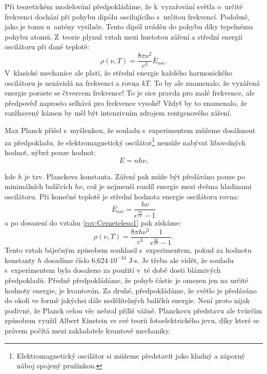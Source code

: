 Při teoretickém modelování předpokládáme, že k~vyzařování světla o~určité frekvenci dochází při pohybu dipólu oscilujícího s~určitou frekvencí. Podobně, jako je tomu u~antény vysílače. Tento dipól uváděn do pohybu díky tepelnému pohybu atomů. Z~teorie plynul vztah mezi hustotou záření a střední energií oscilátoru při dané teplotě:
\begin{equation}
\rho(\nu,T)=\frac{8\pi\nu^2}{c^3}\bar{E}_{osc}\mbox{.}
\label{rov:Cerneteleso1}
\end{equation}
V~klasické mechanice ale platí, že střední energie každého harmonického oscilátoru je nezávislá na frekvenci a rovna $kT$. To by ale znamenalo, že vyzářená energie poroste se čtvercem frekvence! To je sice pravda pro malé frekvence, ale předpověď naprosto selhává pro frekvence vysoké! Vždyť by to znamenalo, že rozžhavený kámen by měl být intenzivním zdrojem rentgenového záření. 

Max Planck přišel s~myšlenkou, že souladu s~experimentem můžeme dosáhnout za předpokladu, že elektromagnetický oscilátor\footnote{ Elektromagnetický oscilátor si můžeme představit jako kladný a záporný náboj spojený pružinkou.} nemůže nabývat libovolných hodnot, nýbrž pouze hodnot:
\begin{equation}
E=nh\nu\mbox{,}
\label{rov:Cerneteleso2}
\end{equation}

\noindent kde $h$ je tzv. Planckova konstanta. Záření pak může být předáváno pouze po minimálních balíčcích $h\nu$, což je nejmenší rozdíl energie mezi dvěma hladinami oscilátoru. Při konečné teplotě je střední hodnota energie oscilátoru rovna:
\begin{equation}
\bar{E}_{osc}=\frac{h\nu}{e^{\frac{h\nu}{kT}}-1}\mbox{}
\label{rov:Cerneteleso3}
\end{equation}
a po dosazení do vztahu \ref{rov:Cerneteleso1} pak získáme:
\begin{equation}
\rho(\nu,T) = \frac{8\pi h\nu^3}{c^3}\frac{1}{e^{\frac{h\nu}{kT}}-1}\mbox{.}
\label{rov:Cerneteleso4}
\end{equation}
Tento vztah báječným způsobem souhlasil s~experimentem, pokud za hodnotu konstanty $h$ dosadíme číslo 6,624$\cdot10^{-34}$ J$\cdot$s. Je třeba ale vidět, že souladu s~experimentem bylo dosaženo za použití v~té době dosti bláznivých předpokladů. Předně předpokládáme, že pohyb částic je omezen jen na určité hodnoty energie, je kvantován. Za druhé, předpokládáme, že světlo je předáváno do okolí ve formě jakýchsi dále nedělitelných balíčků energie. Není proto nijak podivné, že Planck celou věc nebral příliš vážně. Planckovu představu ale tvůrčím způsobem využil Albert Einstein ve své teorii fotoelektrického jevu, díky které se právem počítá mezi zakladatele kvantové mechaniky.

